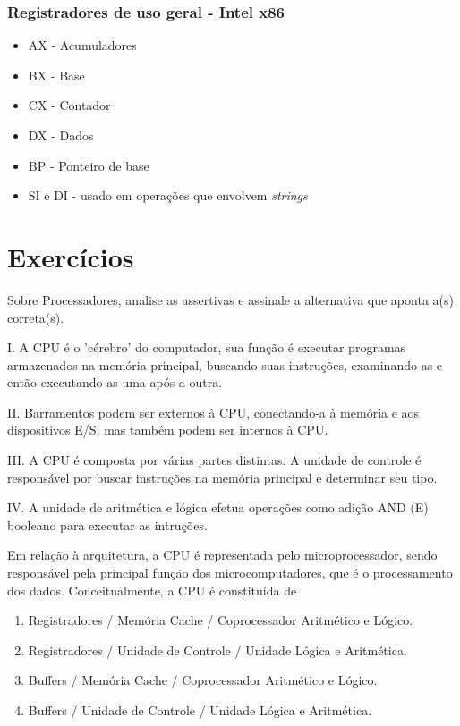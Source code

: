 \documentclass[aspectratio=169,
				xcolor=table]{beamer}
\begin{document}
		\begin{frame}
			\frametitle{Registradores de uso geral - Intel x86}
			\begin{itemize}
				\item AX - Acumuladores
				\item BX - Base
				\item CX - Contador
				\item DX - Dados
				\item BP - Ponteiro de base
				\item SI e DI - usado em operações que envolvem \textit{strings}
			\end{itemize}
			
		\end{frame}
	
	\section{Exercícios}	
	
	\begin{frame}
	
	Sobre Processadores, analise as assertivas e assinale a alternativa que aponta a(s) correta(s). 

I. A CPU é o 'cérebro' do computador, sua função é executar programas armazenados na memória principal, buscando suas instruções, examinando-as e então executando-as uma após a outra. 

\vspace{1em}
II. Barramentos podem ser externos à CPU, conectando-a à memória e aos dispositivos E/S, mas também podem ser internos à CPU. 

\vspace{1em}
III. A CPU é composta por várias partes distintas. A unidade de controle é responsável por buscar instruções na memória principal e determinar seu tipo. 

\vspace{1em}
IV. A unidade de aritmética e lógica efetua operações como adição AND (E) booleano para executar as intruções. 
	\end{frame}
	
	\begin{frame}
		Em relação à arquitetura, a CPU é representada pelo microprocessador, sendo responsável pela principal função dos microcomputadores, que é o processamento dos dados. Conceitualmente, a CPU é constituída de 
		
		\begin{enumerate}[a]
			\item Registradores / Memória Cache / Coprocessador Aritmético e Lógico.
			\item Registradores / Unidade de Controle / Unidade Lógica e Aritmética.
			\item Buffers / Memória Cache / Coprocessador Aritmético e Lógico.
			\item Buffers / Unidade de Controle / Unidade Lógica e Aritmética.
		\end{enumerate}


	\end{frame}
	
\end{document}
